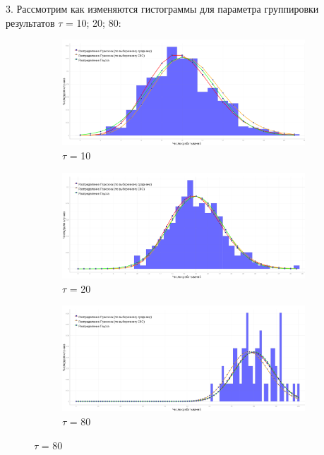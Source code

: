 \documentclass[a4paper, 12pt]{article}
\begin{document}
3. Рассмотрим как изменяются гистограммы для параметра группировки результатов $\tau$ = 10; 20; 80:
\begin{figure}[H]
\captionsetup[subfigure]{labelformat=empty}
\centering
\begin{subfigure}{.33\textwidth}
    \centering
    \includegraphics[width=1\linewidth]{t_10}
    \caption{$\tau$ = 10}
\end{subfigure}%
\begin{subfigure}{.33\textwidth}
    \centering
    \includegraphics[width=1\linewidth]{t_20}
    \caption{$\tau$ = 20}
\end{subfigure}%
\begin{subfigure}{.33\textwidth}
    \centering
    \includegraphics[width=1\linewidth]{t_80}
    \caption{$\tau$ = 80}
\end{subfigure}
\end{figure}
\end{document}
